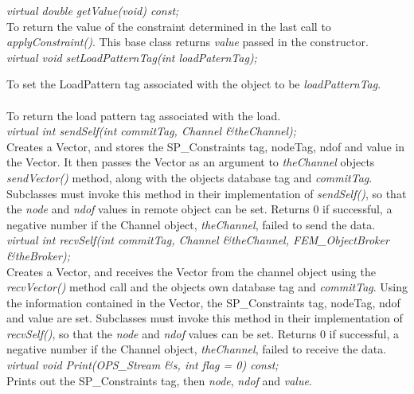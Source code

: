 {\em virtual double getValue(void) const;} \\
To return the value of the constraint determined in the last call to
{\em applyConstraint()}. This base class returns {\em value} passed in
the constructor.  \\ 

{\em virtual void setLoadPatternTag(int loadPaternTag);}

To set the LoadPattern tag associated with the object to be {\em
loadPatternTag}. \\

\\ 
To return the load pattern tag associated with the load. \\

{\em virtual int sendSelf(int commitTag, Channel \&theChannel);} \\ 
Creates a Vector, and stores the SP\_Constraints tag, nodeTag, ndof and value in
the Vector. It then passes the Vector as an argument to {\em
theChannel} objects {\em sendVector()} method, along with the objects 
database tag and {\em commitTag}. Subclasses must invoke this method
in their implementation of {\em sendSelf()}, so that the {\em node}
and {\em ndof} values in remote object can be set. Returns $0$ if
successful, a negative number if the Channel object, {\em theChannel},
failed to send the data. \\ 

{\em virtual int recvSelf(int commitTag, Channel \&theChannel, FEM\_ObjectBroker
\&theBroker);} \\ 
Creates a Vector, and receives the Vector from the channel object
using the {\em recvVector()} method call and the objects own database
tag and {\em commitTag}. Using the information contained in the Vector, the 
SP\_Constraints tag, nodeTag, ndof and value are set. Subclasses must
invoke this method in their implementation of {\em recvSelf()}, so
that the {\em node} and {\em ndof} values can be set. Returns $0$ if
successful, a negative number if the Channel object, {\em
theChannel}, failed to receive the data. \\   

{\em virtual void Print(OPS_Stream \&s, int flag = 0) const;} \\
Prints out the SP\_Constraints tag, then {\em node}, {\em ndof} and
{\em value}. 

